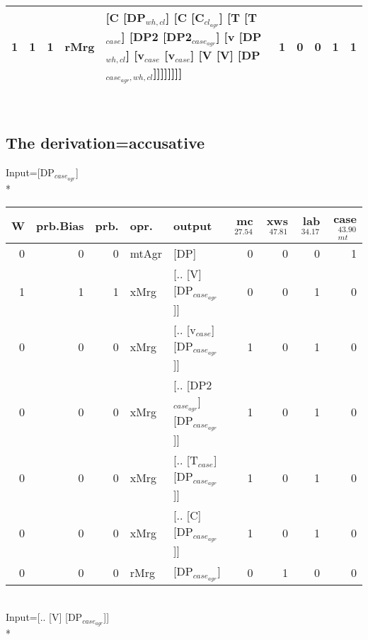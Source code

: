 \begin{tabularx}{\linewidth}{rrrlXrrrrr}
   1 &       1 &   1 & rMrg & [C [DP$_{wh,cl}$] [C [C$_{cl_{agr}}$] [T [T$_{case}$] [DP2 [DP2$_{case_{agr}}$] [v [DP$_{wh,cl}$] [v$_{case}$ [v$_{case}$] [V [V] [DP$_{case_{agr},wh,cl}$]]]]]]]]                                                                                                     &             1 &             0 &                  0 &           1 &           1 \\
\hline
\end{tabularx}\endgroup\\
\subsection{The derivation=accusative}
\begingroup\scriptsize Input=[DP$_{case_{agr}}$]\\*
\begin{tabularx}{\linewidth}{rrrlXrrrr}
\hline
   W &   prb.Bias &   prb. & opr.    & output                            &   mc$^{27.54}$ &   xws$^{47.81}$ &   lab$^{34.17}$ &   case$_{mt}^{43.90}$ \\
\hline
   0 &       0 &   0 & mtAgr & [DP]                              &            0 &             0 &             0 &                 1 \\
   1 &       1 &   1 & xMrg  & [.. [V] [DP$_{case_{agr}}$]]            &            0 &             0 &             1 &                 0 \\
   0 &       0 &   0 & xMrg  & [.. [v$_{case}$] [DP$_{case_{agr}}$]]       &            1 &             0 &             1 &                 0 \\
   0 &       0 &   0 & xMrg  & [.. [DP2$_{case_{agr}}$] [DP$_{case_{agr}}$]] &            1 &             0 &             1 &                 0 \\
   0 &       0 &   0 & xMrg  & [.. [T$_{case}$] [DP$_{case_{agr}}$]]       &            1 &             0 &             1 &                 0 \\
   0 &       0 &   0 & xMrg  & [.. [C] [DP$_{case_{agr}}$]]            &            1 &             0 &             1 &                 0 \\
   0 &       0 &   0 & rMrg  & [DP$_{case_{agr}}$]                     &            0 &             1 &             0 &                 0 \\
\hline
\end{tabularx}\endgroup\\
\begingroup\scriptsize Input=[.. [V] [DP$_{case_{agr}}$]]\\*
